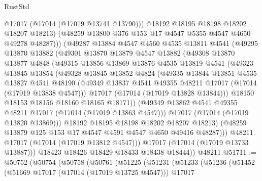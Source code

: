 \begin{lexlean}{RustStd}
\begin{coremodule}
{\begin{coremodule}
{{{{{{{{{{{{{{{{{{{{{{{{{{{{{{{{{{{{{{{{{{{{{{{{{{{{{{{                  @17017
                  (@17014 (@17019 @13741 @13790)))
                @18192
                @18195
                @18198
                @18202
                @18207
                @18213)
              (@48259 @13800 @376 @153 @17 @4547 @5355 @4547 @4650 @49278 @48287)))
          (@49287
            @13884
            @4547
            @4560
            @4535
            @13811
            @4541
            (@49295
              @13870
              @13882
              (@49301
                @13870
                @13879
                @4547
                @13882
                (@49308
                  @13870
                  @13877
                  @4848
                  (@49315
                    @13856
                    @13869
                    @13876
                    @4535
                    @13819
                    @4541
                    (@49323
                      @13845
                      @13854
                      (@49328
                        @13845
                        @13852
                        @4824
                        (@49335
                          @13844
                          @13851
                          @4535
                          @13827
                          @4541
                          @48190
                          (@49349 @13837 @4541 @49355 @48211 @17017 (@17014 (@17019 @13838 @4547)))
                          @17017
                          (@17014 (@17019 @13828 @13844)))
                        @18150
                        @18153
                        @18156
                        @18160
                        @18165
                        @18171))
                    (@49349 @13862 @4541 @49355 @48211 @17017 (@17014 (@17019 @13863 @4547)))
                    @17017
                    (@17014 (@17019 @13820 @13869)))
                  @18192
                  @18195
                  @18198
                  @18202
                  @18207
                  @18213)
                (@48259 @13879 @125 @153 @17 @4547 @4591 @4547 @4650 @49416 @48287)))
            @48211
            @17017
            (@17014 (@17019 @13812 @4547)))
          @17017
          (@17014 (@17019 @13733 @13887)))
        @18423
        @18426
        @18429
        @18433
        @18438
        @18444))
    @48211
@51711 := @50752
    (@50754
      (@50758
        (@50761
          (@51225
            (@51231
              (@51233
                (@51236
                  (@51452
                    (@51669 @17017 (@17014 (@17019 @13725 @4547)))
                    @17017
}}}}}}}}}}}}}}}}}}}}}}}}}}}}}}}}}}}}}}}}}}}}}}}}}}}}}}}
\end{coremodule}}
\end{coremodule}
\end{lexlean}
